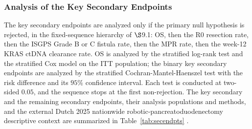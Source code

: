 \subsubsection{Analysis of the Key Secondary Endpoints}

The key secondary endpoints are analyzed only if the primary null hypothesis is
rejected, in the fixed-sequence hierarchy of $\S$9.1: OS, then the R0 resection rate,
then the ISGPS Grade B or C fistula rate, then the MPR rate, then the week-12 KRAS
ctDNA clearance rate. OS is analyzed by the stratified log-rank test and the
stratified Cox model on the ITT population; the binary key secondary endpoints are
analyzed by the stratified Cochran-Mantel-Haenszel test with the risk difference and
its $95\%$ confidence interval. Each test is conducted at two-sided $0.05$, and the
sequence stops at the first non-rejection. The key secondary and the remaining
secondary endpoints, their analysis populations and methods, and the external Dutch
2025 nationwide robotic-pancreatoduodenectomy descriptive context are summarized in
Table~\ref{tab:secendpts} \cite{DutchCohort2025}.

